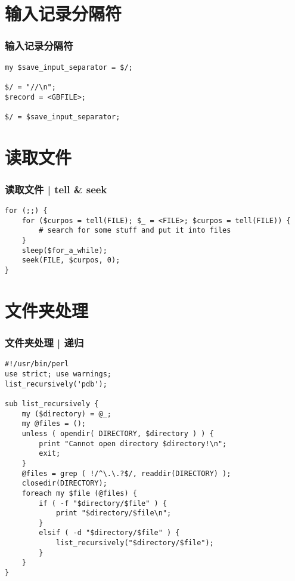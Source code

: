 \section{输入记录分隔符}
\begin{frame}[fragile]
  \frametitle{输入记录分隔符}
  \vspace{-1.5em}
\begin{lstlisting}
my $save_input_separator = $/;

$/ = "//\n";
$record = <GBFILE>;

$/ = $save_input_separator;
\end{lstlisting}  
\end{frame}

\section{读取文件}
\begin{frame}[fragile]
  \frametitle{读取文件 | tell \& seek}
  \vspace{-1.5em}
\begin{lstlisting}
for (;;) {
    for ($curpos = tell(FILE); $_ = <FILE>; $curpos = tell(FILE)) {
        # search for some stuff and put it into files
    }
    sleep($for_a_while);
    seek(FILE, $curpos, 0);
}
\end{lstlisting}
\end{frame}

\section{文件夹处理}
\begin{frame}[fragile]
  \frametitle{文件夹处理 | 递归}
  \vspace{-1.5em}
\begin{lstlisting}[basicstyle=\scriptsize\tt,numberstyle=\tiny]
#!/usr/bin/perl
use strict; use warnings;
list_recursively('pdb');

sub list_recursively {
    my ($directory) = @_;
    my @files = ();
    unless ( opendir( DIRECTORY, $directory ) ) {
        print "Cannot open directory $directory!\n";
        exit;
    }
    @files = grep ( !/^\.\.?$/, readdir(DIRECTORY) );
    closedir(DIRECTORY);
    foreach my $file (@files) {
        if ( -f "$directory/$file" ) {
            print "$directory/$file\n";
        }
        elsif ( -d "$directory/$file" ) {
            list_recursively("$directory/$file");
        }
    }
}
\end{lstlisting}
\end{frame}

